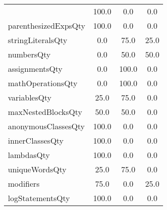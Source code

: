 \begin{tabular}{lccc}
{tryCatchQty & 100.0 & 0.0 & 0.0 \\
parenthesizedExpsQty & 100.0 & 0.0 & 0.0 \\
stringLiteralsQty & 0.0 & 75.0 & 25.0 \\
numbersQty & 0.0 & 50.0 & 50.0 \\
assignmentsQty & 0.0 & 100.0 & 0.0 \\
mathOperationsQty & 0.0 & 100.0 & 0.0 \\
variablesQty & 25.0 & 75.0 & 0.0 \\
maxNestedBlocksQty & 50.0 & 50.0 & 0.0 \\
anonymousClassesQty & 100.0 & 0.0 & 0.0 \\
innerClassesQty & 100.0 & 0.0 & 0.0 \\
lambdasQty & 100.0 & 0.0 & 0.0 \\
uniqueWordsQty & 25.0 & 75.0 & 0.0 \\
modifiers & 75.0 & 0.0 & 25.0 \\
logStatementsQty & 100.0 & 0.0 & 0.0 \\
\bottomrule
              \end{tabular}
            